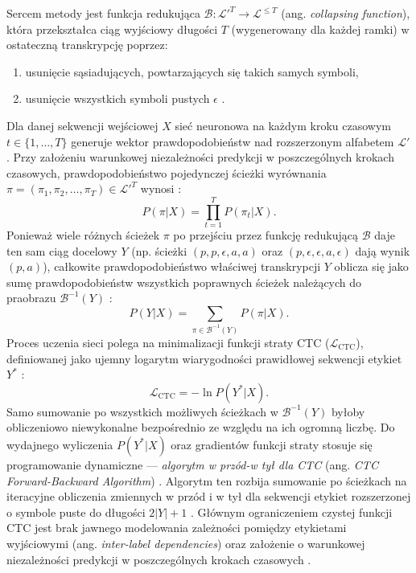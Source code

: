 Sercem metody jest funkcja redukująca $\mathcal{B}: \mathcal{L}'^T \to \mathcal{L}^{\le T}$ (ang. \textit{collapsing function}), która przekształca ciąg wyjściowy długości $T$ (wygenerowany dla każdej ramki) w ostateczną transkrypcję poprzez:
\begin{enumerate}
\item usunięcie sąsiadujących, powtarzających się takich samych symboli,

\item usunięcie wszystkich symboli pustych $\epsilon$ \cite[s.~3]{graves2006ctc}.
\end{enumerate}
Dla danej sekwencji wejściowej $X$ sieć neuronowa na każdym kroku czasowym $t \in \{1, \dots, T\}$ generuje wektor prawdopodobieństw nad rozszerzonym alfabetem $\mathcal{L}'$. Przy założeniu warunkowej niezależności predykcji w poszczególnych krokach czasowych, prawdopodobieństwo pojedynczej ścieżki wyrównania $\pi = (\pi_1, \pi_2, \dots, \pi_T) \in \mathcal{L}'^T$ wynosi \cite[s.~2]{graves2006ctc}:
\begin{equation}
    P(\pi|X) = \prod_{t=1}^{T} P(\pi_t | X).
\end{equation}
Ponieważ wiele różnych ścieżek $\pi$ po przejściu przez funkcję redukującą $\mathcal{B}$ daje ten sam ciąg docelowy $Y$ (np. ścieżki $(p, p, \epsilon, a, a)$ oraz $(p, \epsilon, \epsilon, a, \epsilon)$ dają wynik $(p, a)$), całkowite prawdopodobieństwo właściwej transkrypcji $Y$ oblicza się jako sumę prawdopodobieństw wszystkich poprawnych ścieżek należących do praobrazu $\mathcal{B}^{-1}(Y)$ \cite[s.~2]{graves2006ctc}:
\begin{equation}
    P(Y|X) = \sum_{\pi \in \mathcal{B}^{-1}(Y)} P(\pi|X).
\end{equation}
Proces uczenia sieci polega na minimalizacji funkcji straty CTC ($\mathcal{L}_{\text{CTC}}$), definiowanej jako ujemny logarytm wiarygodności prawidłowej sekwencji etykiet $Y^*$ \cite[s.~376]{jurafsky2026}:
\begin{equation}
    \mathcal{L}_{\text{CTC}} = -\ln P(Y^*|X).
\end{equation}
Samo sumowanie po wszystkich możliwych ścieżkach w $\mathcal{B}^{-1}(Y)$ byłoby obliczeniowo niewykonalne bezpośrednio ze względu na ich ogromną liczbę. Do wydajnego wyliczenia $P(Y^*|X)$ oraz gradientów funkcji straty stosuje się programowanie dynamiczne — \textit{algorytm w przód-w tył dla CTC} (ang. \textit{CTC Forward-Backward Algorithm}) \cite[s.~3--4]{graves2006ctc}. Algorytm ten rozbija sumowanie po ścieżkach na iteracyjne obliczenia zmiennych w przód i w tył dla sekwencji etykiet rozszerzonej o symbole puste do długości $2|Y|+1$ \cite[s.~3--4]{graves2006ctc}. Głównym ograniczeniem czystej funkcji CTC jest brak jawnego modelowania zależności pomiędzy etykietami wyjściowymi (ang. \textit{inter-label dependencies}) oraz założenie o warunkowej niezależności predykcji w poszczególnych krokach czasowych \cite[s.~8]{graves2006ctc}.
